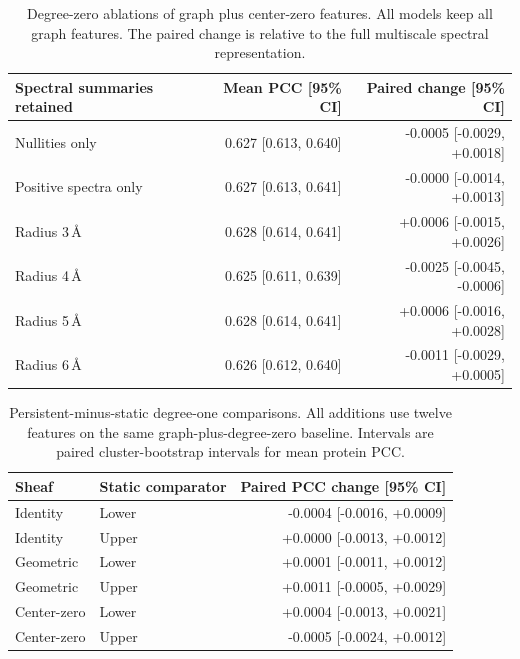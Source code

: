 


\begin{table}[htbp]\centering\small
\caption{Degree-zero ablations of graph plus center-zero features. All models keep all graph features. The paired change is relative to the full multiscale spectral representation.}
\begin{tabular}{lrr}\toprule
Spectral summaries retained & Mean PCC [95\% CI] & Paired change [95\% CI]\\\midrule
Nullities only & 0.627 [0.613, 0.640] & -0.0005 [-0.0029, +0.0018] \\
Positive spectra only & 0.627 [0.613, 0.641] & -0.0000 [-0.0014, +0.0013] \\
Radius 3\,\AA & 0.628 [0.614, 0.641] & +0.0006 [-0.0015, +0.0026] \\
Radius 4\,\AA & 0.625 [0.611, 0.639] & -0.0025 [-0.0045, -0.0006] \\
Radius 5\,\AA & 0.628 [0.614, 0.641] & +0.0006 [-0.0016, +0.0028] \\
Radius 6\,\AA & 0.626 [0.612, 0.640] & -0.0011 [-0.0029, +0.0005] \\
\bottomrule\end{tabular}\end{table}




\begin{table}[htbp]\centering\small
\caption{Persistent-minus-static degree-one comparisons. All additions use twelve features on the same graph-plus-degree-zero baseline. Intervals are paired cluster-bootstrap intervals for mean protein PCC.}
\begin{tabular}{llr}\toprule
Sheaf & Static comparator & Paired PCC change [95\% CI]\\\midrule
Identity & Lower & -0.0004 [-0.0016, +0.0009] \\
Identity & Upper & +0.0000 [-0.0013, +0.0012] \\
Geometric & Lower & +0.0001 [-0.0011, +0.0012] \\
Geometric & Upper & +0.0011 [-0.0005, +0.0029] \\
Center-zero & Lower & +0.0004 [-0.0013, +0.0021] \\
Center-zero & Upper & -0.0005 [-0.0024, +0.0012] \\
\bottomrule\end{tabular}\end{table}





